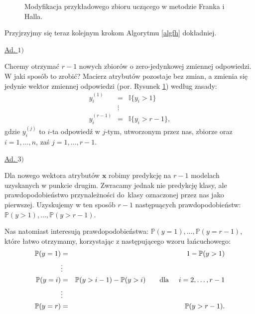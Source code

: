 \documentclass{mini}
\begin{document}
\begin{figure}[h]
\begin{center}
\end{center}
\caption{Modyfikacja przykładowego zbioru uczącego w metodzie Franka i Halla.}
\label{fh}
\end{figure}

Przyjrzyjmy się teraz kolejnym krokom Algorytmu \ref{algfh} dokładniej.

\underline{Ad. $1)$}

Chcemy otrzymać $r-1$ nowych zbiorów o zero-jedynkowej zmiennej odpowiedzi. W jaki sposób to zrobić?
Macierz atrybutów pozostaje bez zmian, a zmienia się jedynie wektor zmiennej odpowiedzi (por. Rysunek \ref{fh}) według zasady:
\begin{eqnarray*}
y_i^{(1)} &=& \mathbb{I}\lbrace y_i>1 \rbrace\\
&\vdots& \\
y_i^{(r-1)} &=& \mathbb{I}\lbrace y_i>r-1 \rbrace,
\end{eqnarray*}
gdzie $y_i^{(j)}$ to $i$-ta odpowiedź w $j$-tym, utworzonym przez nas, zbiorze oraz $i=1,\ldots,n$, zaś $j=1,\ldots, r-1$. 

\underline{Ad. $3)$}

Dla nowego wektora atrybutów $\textbf{x}$ robimy predykcję na $r-1$ modelach uzyskanych w punkcie drugim. Zwracamy jednak nie predykcję klasy, ale prawdopodobieństwo przynależności do~klasy oznaczonej przez nas jako pierwszej. Uzyskujemy w ten sposób $r-1$ następuących prawdopodobieństw: $\mathbb{P}(y > 1), \ldots, \mathbb{P}(y > r-1)$.

Nas natomiast interesują prawdopodobieństwa: $\mathbb{P}(y = 1), \ldots, \mathbb{P}(y = r-1)$, które łatwo otrzymamy, korzystając z następującego wzoru łańcuchowego:
\begin{eqnarray*}
\mathbb{P}(y = 1) &=& 1 - \mathbb{P}(y > 1)\\
&\vdots& \\
\mathbb{P}(y = i) &=& \mathbb{P}(y > i-1) - \mathbb{P}(y > i) \qquad \text{dla}\hspace{5mm} i=2, \ldots, r-1\\
&\vdots& \\
\mathbb{P}(y = r) &=& \mathbb{P}(y > r-1).\\
\end{eqnarray*}
\end{document}
